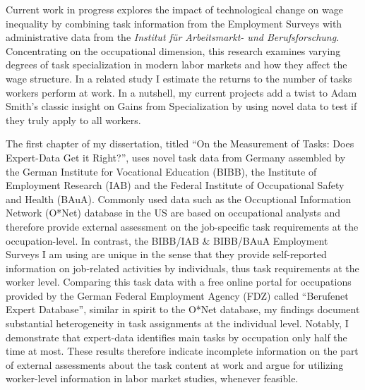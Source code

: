\documentclass[a4paper,11pt]{article}
\begin{document}
Current work in progress explores the impact of technological change on wage inequality by combining task information from the Employment Surveys with  administrative data from the \textit{Institut f{\"u}r Arbeitsmarkt- und Berufsforschung}. Concentrating on the occupational dimension, this research examines varying degrees of task specialization in modern labor markets and how they affect the wage structure. In a related study I estimate the returns to the number of tasks workers perform at work. In a nutshell, my current projects add a twist to Adam Smith's classic insight on Gains from Specialization by using novel data to test if they truly apply to all workers. 



The first chapter of my dissertation, titled ``On the Measurement of Tasks: Does Expert-Data Get it Right?'', uses novel task data from Germany assembled by the German Institute for Vocational Education (BIBB), the Institute of Employment Research (IAB) and the Federal Institute of Occupational Safety and Health (BAuA). Commonly used data such as the Occuptional Information Network (O*Net) database in the US are based on occupational analysts and therefore provide external assessment on the job-specific task requirements at the occupation-level. In contrast, the BIBB/IAB \& BIBB/BAuA Employment Surveys I am using are unique in the sense that they provide self-reported information on job-related activities by individuals, thus task requirements at the worker level. Comparing this task data with a free online portal for occupations provided by the German Federal Employment Agency (FDZ) called ``Berufenet Expert Database'', similar in spirit to the O*Net database, my findings document substantial heterogeneity in task assignments at the individual level. Notably, I demonstrate that expert-data identifies main tasks by occupation only half the time at most. These results therefore indicate incomplete information on the part of external assessments about the task content at work and argue for utilizing worker-level information in labor market studies, whenever feasible. 
\end{document}

